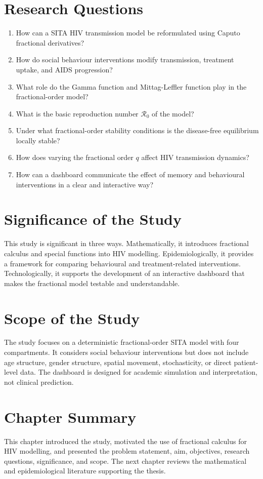\documentclass[12pt,a4paper,oneside]{report}
\newcommand{\Rzero}{\mathcal{R}_0}
\begin{document}
\section{Research Questions}
\begin{enumerate}
  \item How can a SITA HIV transmission model be reformulated using Caputo fractional derivatives?
  \item How do social behaviour interventions modify transmission, treatment uptake, and AIDS progression?
  \item What role do the Gamma function and Mittag-Leffler function play in the fractional-order model?
  \item What is the basic reproduction number $\Rzero$ of the model?
  \item Under what fractional-order stability conditions is the disease-free equilibrium locally stable?
  \item How does varying the fractional order $q$ affect HIV transmission dynamics?
  \item How can a dashboard communicate the effect of memory and behavioural interventions in a clear and interactive way?
\end{enumerate}

\section{Significance of the Study}
This study is significant in three ways. Mathematically, it introduces fractional calculus and special functions into HIV modelling. Epidemiologically, it provides a framework for comparing behavioural and treatment-related interventions. Technologically, it supports the development of an interactive dashboard that makes the fractional model testable and understandable.

\section{Scope of the Study}
The study focuses on a deterministic fractional-order SITA model with four compartments. It considers social behaviour interventions but does not include age structure, gender structure, spatial movement, stochasticity, or direct patient-level data. The dashboard is designed for academic simulation and interpretation, not clinical prediction.

\section{Chapter Summary}
This chapter introduced the study, motivated the use of fractional calculus for HIV modelling, and presented the problem statement, aim, objectives, research questions, significance, and scope. The next chapter reviews the mathematical and epidemiological literature supporting the thesis.
\end{document}
